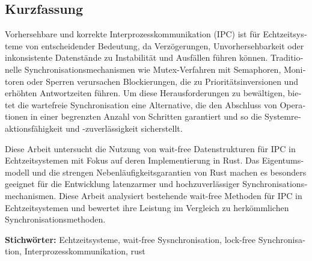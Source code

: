 \cleardoublepage

\begin{otherlanguage}{ngerman}
\chapter*{Kurzfassung}


Vorhersehbare und korrekte Interprozesskommunikation (IPC) ist für Echtzeitsysteme von entscheidender Bedeutung, da Verzögerungen, Unvorhersehbarkeit oder inkonsistente Datenstände zu Instabilität und Ausfällen führen können. Traditionelle Synchronisationsmechanismen wie Mutex-Verfahren mit Semaphoren, Monitoren oder Sperren verursachen Blockierungen, die zu Prioritätsinversionen und erhöhten Antwortzeiten führen. Um diese Herausforderungen zu bewältigen, bietet die wartefreie Synchronisation eine Alternative, die den Abschluss von Operationen in einer begrenzten Anzahl von Schritten garantiert und so die Systemreaktionsfähigkeit und -zuverlässigkeit sicherstellt.

Diese Arbeit untersucht die Nutzung von wait-free Datenstrukturen für IPC in Echtzeitsystemen mit Fokus auf deren Implementierung in Rust. Das Eigentumsmodell und die strengen Nebenläufigkeitsgarantien von Rust machen es besonders geeignet für die Entwicklung latenzarmer und hochzuverlässiger Synchronisationsmechanismen. Diese Arbeit analysiert bestehende wait-free Methoden für IPC in Echtzeitsystemen und bewertet ihre Leistung im Vergleich zu herkömmlichen Synchronisationsmethoden.

\vfill
\noindent\textbf{Stichwörter:} Echtzeitsysteme, wait-free Sysnchronisation, lock-free Synchronisation, Interprozesskommunikation, rust
\vfill
\end{otherlanguage}
